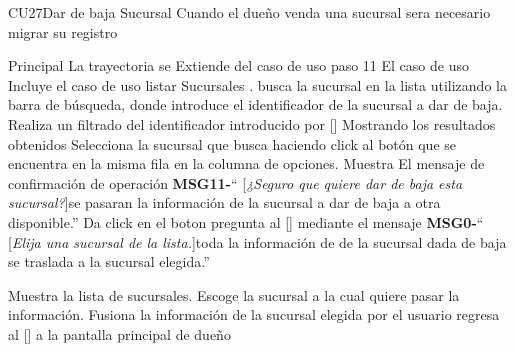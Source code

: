 \begin{UseCase}{CU27}{Dar de baja Sucursal}{
	Cuando el dueño venda una sucursal sera necesario migrar su registro
	}
	\end{UseCase}
	\begin{UCtrayectoria}{Principal}
		\UCpaso La trayectoria se Extiende del caso de uso  paso 11
		\UCpaso El caso de uso Incluye el caso de uso listar Sucursales . 
		\UCpaso [\UCactor] busca la sucursal en la lista utilizando la barra de búsqueda, donde introduce el identificador de la sucursal a dar de baja.		
		\UCpaso Realiza un filtrado del identificador introducido por [\UCactor] Mostrando los resultados obtenidos
		\UCpaso[\UCactor] Selecciona la sucursal que busca haciendo click al botón  que se encuentra en la misma fila en la columna de opciones.
		\UCpaso Muestra El mensaje de confirmación de operación {\bf MSG11-}`` [{\em ¿Seguro que quiere dar de baja esta sucursal?}]se pasaran la información de la sucursal a dar de baja a otra disponible.''
		\UCpaso [\UCactor] Da click en el boton 
		\UCpaso pregunta al [\UCactor] mediante el mensaje 
		{\bf MSG0-}`` [{\em Elija una sucursal de la lista.}]toda la información de de la sucursal dada de baja se traslada a la sucursal elegida.'' 

		\UCpaso Muestra la lista de sucursales.
		\UCpaso [\UCactor] Escoge la sucursal a la cual quiere pasar la información.
		\UCpaso Fusiona la información de la sucursal elegida por el usuario
		\UCpaso regresa al [\UCactor] a la pantalla principal de dueño
	\end{UCtrayectoria}

